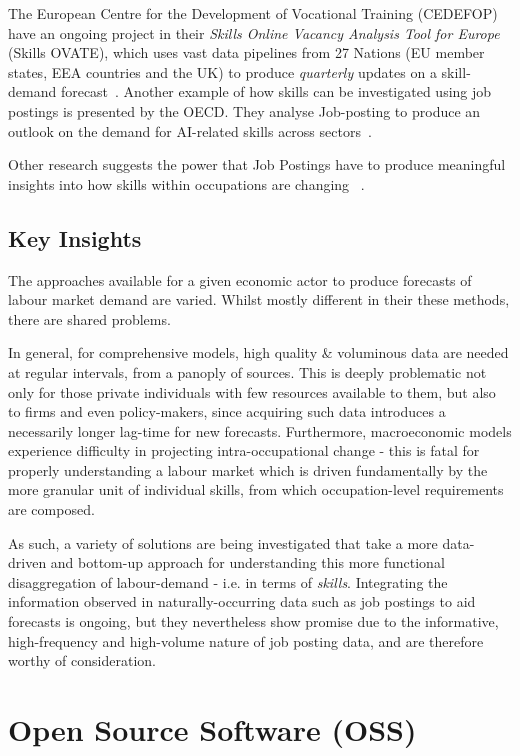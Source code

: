 The European Centre for the Development of Vocational Training (CEDEFOP) have an ongoing project in their \emph{Skills Online Vacancy Analysis Tool for Europe} (Skills OVATE), which uses vast data pipelines from 27 Nations (EU member states, EEA countries and the UK) to produce \emph{quarterly} updates on a skill-demand forecast~\cite{_2017_SkillsOnline}.
Another example of how skills can be investigated using job postings is presented by the OECD. They analyse Job-posting to produce an outlook on the demand for AI-related skills across sectors~\cite{noauthor_2021-ot}.

Other research suggests the power that Job Postings have to produce meaningful insights into how skills within occupations are changing ~\cite{lukauskas_2023_EnhancingSkills, deming_2018_SkillRequirements, sibarani_2017_OntologyguidedJob}.


\subsection{Key Insights}

The approaches available for a given economic actor to produce forecasts of labour market demand are varied.
Whilst mostly different in their these methods, there are shared problems.

In general, for comprehensive models, high quality \& voluminous data are needed at regular intervals, from a panoply of sources. This is deeply problematic not only for those private individuals with few resources available to them,
but also to firms and even policy-makers, since acquiring such data introduces a necessarily longer lag-time for new forecasts.
Furthermore, macroeconomic models experience difficulty in projecting intra-occupational change - this is fatal for properly understanding a labour market which is driven fundamentally by the more granular unit of individual skills, from which occupation-level requirements are composed.

As such, a variety of solutions are being investigated that take a more data-driven and bottom-up approach for understanding this more functional disaggregation of labour-demand - i.e. in terms of \emph{skills}.
Integrating the information observed in naturally-occurring data such as job postings to aid forecasts is ongoing, but they nevertheless show promise due to the informative, high-frequency and high-volume nature of job posting data, and are therefore worthy of consideration.

\section{Open Source Software (OSS)}
